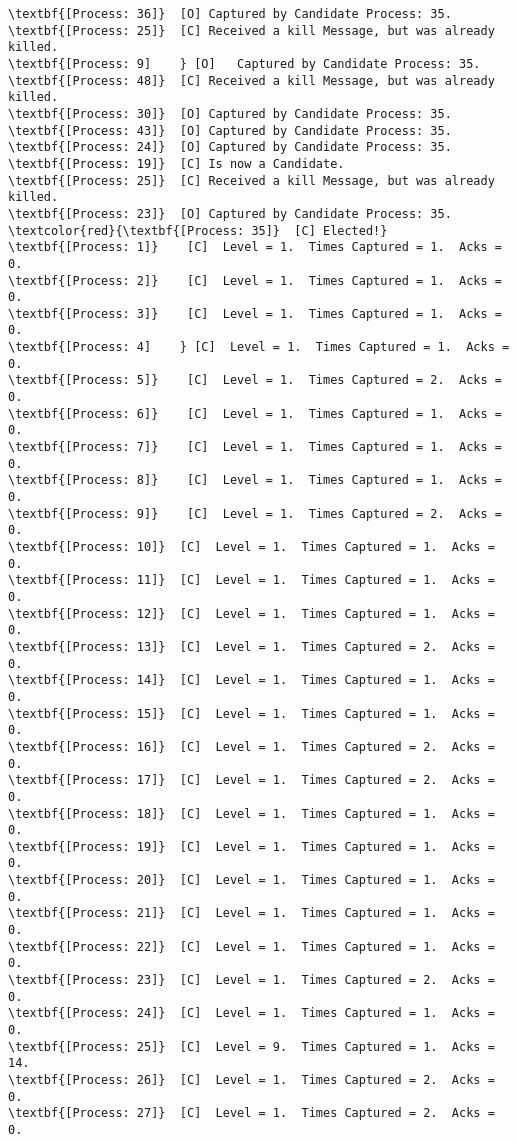\begin{Verbatim}[commandchars=\\\{\},codes={\catcode`$=3\catcode`_=8},frame=single,label=Test 6 output]
\textbf{[Process: 36]}	[O]	Captured by Candidate Process: 35.
\textbf{[Process: 25]}	[C]	Received a kill Message, but was already killed.
\textbf{[Process: 9]	} [O]	Captured by Candidate Process: 35.
\textbf{[Process: 48]}	[C]	Received a kill Message, but was already killed.
\textbf{[Process: 30]}	[O]	Captured by Candidate Process: 35.
\textbf{[Process: 43]}	[O]	Captured by Candidate Process: 35.
\textbf{[Process: 24]}	[O]	Captured by Candidate Process: 35.
\textbf{[Process: 19]}	[C]	Is now a Candidate.
\textbf{[Process: 25]}	[C]	Received a kill Message, but was already killed.
\textbf{[Process: 23]}	[O]	Captured by Candidate Process: 35.
\textcolor{red}{\textbf{[Process: 35]}	[C]	Elected!} 
\textbf{[Process: 1]}	 [C]  Level = 1.  Times Captured = 1.  Acks = 0.
\textbf{[Process: 2]}	 [C]  Level = 1.  Times Captured = 1.  Acks = 0.
\textbf{[Process: 3]}	 [C]  Level = 1.  Times Captured = 1.  Acks = 0.
\textbf{[Process: 4]	} [C]  Level = 1.  Times Captured = 1.  Acks = 0.
\textbf{[Process: 5]}	 [C]  Level = 1.  Times Captured = 2.  Acks = 0.
\textbf{[Process: 6]}	 [C]  Level = 1.  Times Captured = 1.  Acks = 0.
\textbf{[Process: 7]}	 [C]  Level = 1.  Times Captured = 1.  Acks = 0.
\textbf{[Process: 8]}	 [C]  Level = 1.  Times Captured = 1.  Acks = 0.
\textbf{[Process: 9]}	 [C]  Level = 1.  Times Captured = 2.  Acks = 0.
\textbf{[Process: 10]}	[C]  Level = 1.  Times Captured = 1.  Acks = 0.
\textbf{[Process: 11]}	[C]  Level = 1.  Times Captured = 1.  Acks = 0.
\textbf{[Process: 12]}	[C]  Level = 1.  Times Captured = 1.  Acks = 0.
\textbf{[Process: 13]}	[C]  Level = 1.  Times Captured = 2.  Acks = 0.
\textbf{[Process: 14]}	[C]  Level = 1.  Times Captured = 1.  Acks = 0.
\textbf{[Process: 15]}	[C]  Level = 1.  Times Captured = 1.  Acks = 0.
\textbf{[Process: 16]}	[C]  Level = 1.  Times Captured = 2.  Acks = 0.
\textbf{[Process: 17]}	[C]  Level = 1.  Times Captured = 2.  Acks = 0.
\textbf{[Process: 18]}	[C]  Level = 1.  Times Captured = 1.  Acks = 0.
\textbf{[Process: 19]}	[C]  Level = 1.  Times Captured = 1.  Acks = 0.
\textbf{[Process: 20]}	[C]  Level = 1.  Times Captured = 1.  Acks = 0.
\textbf{[Process: 21]}	[C]  Level = 1.  Times Captured = 1.  Acks = 0.
\textbf{[Process: 22]}	[C]  Level = 1.  Times Captured = 1.  Acks = 0.
\textbf{[Process: 23]}	[C]  Level = 1.  Times Captured = 2.  Acks = 0.
\textbf{[Process: 24]}	[C]  Level = 1.  Times Captured = 1.  Acks = 0.
\textbf{[Process: 25]}	[C]  Level = 9.  Times Captured = 1.  Acks = 14.
\textbf{[Process: 26]}	[C]  Level = 1.  Times Captured = 2.  Acks = 0.
\textbf{[Process: 27]}	[C]  Level = 1.  Times Captured = 2.  Acks = 0.

\end{Verbatim}
